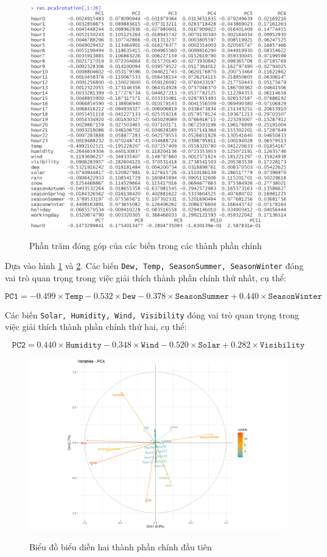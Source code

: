\begin{figure}[H]
	\centering
	{\includegraphics[width=.9\linewidth]{../Photo Of Result/A2_loading.PNG}}
	\caption{Phần trăm đóng góp của các biến trong các thành phần chính}
	\label{A2_loading}
\end{figure}

Dựa vào hình \ref{A2_loading} và \ref{A2_plot}. Các biến \texttt{Dew, Temp, SeasonSummer, SeasonWinter} đóng vai trò quan trọng trong việc giải thích thành phần chính thứ nhất, cụ thể:

$$\texttt{PC1} = -0.499 \times \texttt{Temp} -0.532 \times \texttt{Dew} -0.378 \times \texttt{SeasonSummer} + 0.440 \times \texttt{SeasonWinter}$$

Các biến \texttt{Solar, Humidity, Wind, Visibility} đóng vai trò quan trọng trong việc giải thích thành phần chính thứ hai, cụ thể:

$$\texttt{PC2} = 0.440 \times \texttt{Humidity} -0.348 \times \texttt{Wind} -0.520 \times \texttt{Solar} + 0.282 \times \texttt{Visibility}$$

\begin{figure}[H]
	\centering
	{\includegraphics[width=.8\linewidth]{../Photo Of Result/A2_pca.PNG}}
	\caption{Biểu đồ biểu diễn hai thành phần chính đầu tiên}
	\label{A2_plot}
\end{figure}

